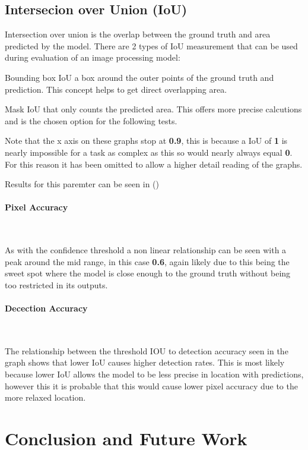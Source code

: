 \documentclass[final]{cmpreport_02}
\begin{document}
\subsection{Intersecion over Union (IoU)}
Intersection over union is the overlap between the ground truth and area predicted by the model.
There are 2 types of IoU measurement that can be used during evaluation of an image processing model:

Bounding box IoU a box around the outer points of the ground truth and prediction.
This concept helps to get direct overlapping area.

Mask IoU that only counts the predicted area. This offers more precise calcutions and is the chosen option for the following tests.

Note that the x axis on these graphs stop at \textbf{0.9}, this is because a IoU of \textbf{1} is nearly impossible for a task as complex as this so would nearly always equal \textbf{0}. For this reason it has been omitted to allow a higher detail reading of the graphs.

Results for this paremter can be seen in ()

\paragraph{Pixel Accuracy} \

As with the confidence threshold a non linear relationship can be seen with a peak around the mid range, in this case \textbf{0.6}, again likely due to this being the sweet spot where the model is close enough to the ground truth without being too restricted in its outputs.

\paragraph{Decection Accuracy} \

The relationship between the threshold  IOU to detection accuracy seen in the graph shows that lower IoU causes higher detection rates.
This is most likely because lower IoU allows the model to be less precise in location with predictions, however this it is probable that this would cause lower pixel accuracy due to the more relaxed location. 


\section{Conclusion and Future Work}
\end{document}
